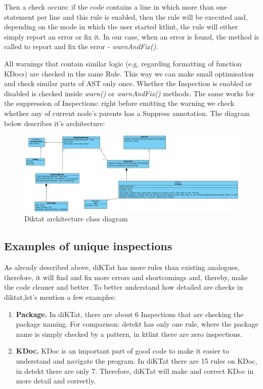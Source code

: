 Then a check occurs: if the code contains a line in which more than one statement per line and this rule is enabled, then the rule will be executed and, depending on the mode in which the user started ktlint, the rule will either simply report an error or fix it. In our case, when an error is found, the method is called to report and fix the error - \textsl{warnAndFix()}.

All warnings that contain similar logic (e.g. regarding formatting of function KDocs) are checked in the same Rule. This way we can make small optimisation and check similar parts of AST only once. Whether the Inspection is enabled or disabled is checked inside \textsl{warn()} or \textsl{warnAndFix()} methods. The same works for the suppression of Inspections: right before emitting the warning we check whether any of current node's parents has a Suppress annotation. The diagram below describes it's architecture:

\begin{figure}[H]
    \centering
    \includegraphics[scale=0.5]{pictures/class.PNG}
    \caption{Diktat architecture class diagram}
    \label{fig:top_languages}
\end{figure}


\subsection{Examples of unique inspections}
\par
As already described above, diKTat has more rules than existing analogues, therefore, it will find and fix more errors and shortcomings and, thereby, make the code cleaner and better. To better understand how detailed are checks in diktat,let's mention a few examples:

\begin{enumerate}
    \item \textbf{Package.}
In diKTat, there are about 6 Inspections that are checking the package naming. For comparison: detekt has only one rule, where the package name is simply checked by a pattern, in ktlint there are zero inspections.
    \item \textbf{KDoc.}
KDoc is an important part of good code to make it easier to understand and navigate the program. In diKTat there are 15 rules on KDoc, in detekt there are only 7. Therefore, diKTat will make and correct KDoc in more detail and correctly. 
\end{enumerate}

